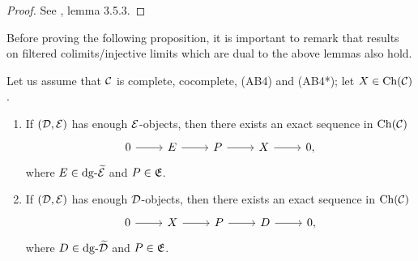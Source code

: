 \begin{proof}
    See \cite{Weibel_1994}, lemma 3.5.3.
\end{proof}

Before proving the following proposition, it is important to remark that results on filtered colimits/injective limits which are dual to the above lemmas also hold.

\begin{proposition}
    \label{prop:enough-objects}
    Let us assume that $\mathcal{C}$ is complete, cocomplete, (AB4) and (AB4*); let $X \in \mathrm{Ch}(\mathcal{C})$.
    \begin{enumerate}
        \itemsep0em 
        \item If $(\mathcal{D}, \mathcal{E})$ has enough $\mathcal{E}$-objects, then there exists an exact sequence in $\mathrm{Ch}(\mathcal{C})$
            \[\begin{tikzcd}
                0 & E & P & X & {0,}
                \arrow[from=1-1, to=1-2]
                \arrow[from=1-2, to=1-3]
                \arrow[from=1-3, to=1-4]
                \arrow[from=1-4, to=1-5]
            \end{tikzcd}\]
            where $E \in \mathrm{dg} \text{-}\widetilde{\mathcal{E}}$ and $P \in \mathfrak{E}$.
        \item If $(\mathcal{D}, \mathcal{E})$ has enough $\mathcal{D}$-objects, then there exists an exact sequence in $\mathrm{Ch}(\mathcal{C})$
            \[\begin{tikzcd}
                0 & X & P & D & {0,}
                \arrow[from=1-1, to=1-2]
                \arrow[from=1-2, to=1-3]
                \arrow[from=1-3, to=1-4]
                \arrow[from=1-4, to=1-5]
            \end{tikzcd}\]
            where $D \in \mathrm{dg} \text{-}\widetilde{\mathcal{D}}$ and $P \in \mathfrak{E}$.
    \end{enumerate}
\end{proposition}




